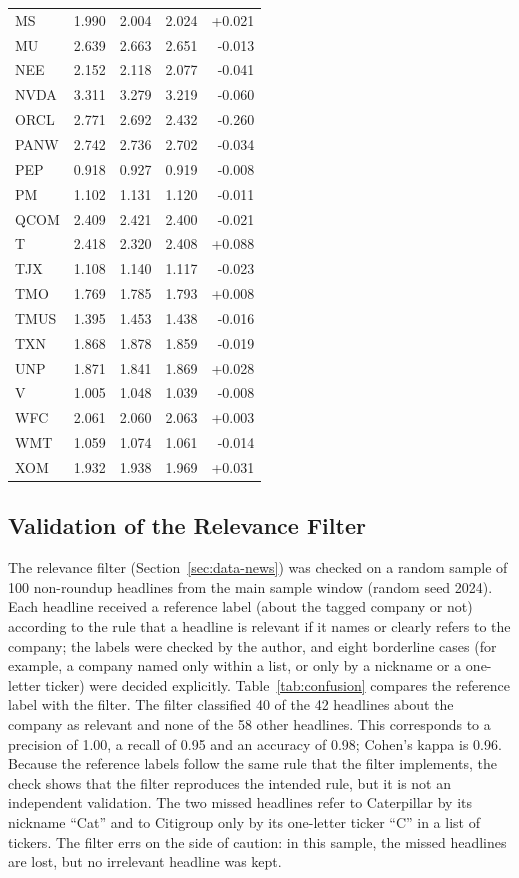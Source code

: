 \documentclass[12pt,a4paper]{article}
\begin{document}
\begin{longtable}{lrrrr}
MS & 1.990 & 2.004 & 2.024 & +0.021 \\
MU & 2.639 & 2.663 & 2.651 & -0.013 \\
NEE & 2.152 & 2.118 & 2.077 & -0.041 \\
NVDA & 3.311 & 3.279 & 3.219 & -0.060 \\
ORCL & 2.771 & 2.692 & 2.432 & -0.260 \\
PANW & 2.742 & 2.736 & 2.702 & -0.034 \\
PEP & 0.918 & 0.927 & 0.919 & -0.008 \\
PM & 1.102 & 1.131 & 1.120 & -0.011 \\
QCOM & 2.409 & 2.421 & 2.400 & -0.021 \\
T & 2.418 & 2.320 & 2.408 & +0.088 \\
TJX & 1.108 & 1.140 & 1.117 & -0.023 \\
TMO & 1.769 & 1.785 & 1.793 & +0.008 \\
TMUS & 1.395 & 1.453 & 1.438 & -0.016 \\
TXN & 1.868 & 1.878 & 1.859 & -0.019 \\
UNP & 1.871 & 1.841 & 1.869 & +0.028 \\
V & 1.005 & 1.048 & 1.039 & -0.008 \\
WFC & 2.061 & 2.060 & 2.063 & +0.003 \\
WMT & 1.059 & 1.074 & 1.061 & -0.014 \\
XOM & 1.932 & 1.938 & 1.969 & +0.031 \\
\end{longtable}

\subsection{Validation of the Relevance Filter}\label{sec:appendix-validation}
The relevance filter (Section~\ref{sec:data-news}) was checked on a random sample of 100 non-roundup headlines from the main sample window (random seed 2024). Each headline received a reference label (about the tagged company or not) according to the rule that a headline is relevant if it names or clearly refers to the company; the labels were checked by the author, and eight borderline cases (for example, a company named only within a list, or only by a nickname or a one-letter ticker) were decided explicitly. Table~\ref{tab:confusion} compares the reference label with the filter. The filter classified 40 of the 42 headlines about the company as relevant and none of the 58 other headlines. This corresponds to a precision of 1.00, a recall of 0.95 and an accuracy of 0.98; Cohen's kappa is 0.96. Because the reference labels follow the same rule that the filter implements, the check shows that the filter reproduces the intended rule, but it is not an independent validation. The two missed headlines refer to Caterpillar by its nickname \enquote{Cat} and to Citigroup only by its one-letter ticker \enquote{C} in a list of tickers. The filter errs on the side of caution: in this sample, the missed headlines are lost, but no irrelevant headline was kept.
\end{document}
